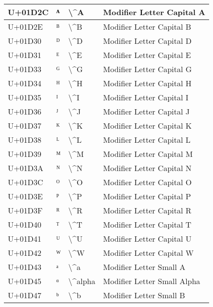 \begin{table}[h]
\begin{tabulary}{\linewidth}{|L|L|L|L|}
\hline
U+01D2C & ᴬ & {\textbackslash}{\textasciicircum}A & Modifier Letter Capital A \\
\hline
U+01D2E & ᴮ & {\textbackslash}{\textasciicircum}B & Modifier Letter Capital B \\
\hline
U+01D30 & ᴰ & {\textbackslash}{\textasciicircum}D & Modifier Letter Capital D \\
\hline
U+01D31 & ᴱ & {\textbackslash}{\textasciicircum}E & Modifier Letter Capital E \\
\hline
U+01D33 & ᴳ & {\textbackslash}{\textasciicircum}G & Modifier Letter Capital G \\
\hline
U+01D34 & ᴴ & {\textbackslash}{\textasciicircum}H & Modifier Letter Capital H \\
\hline
U+01D35 & ᴵ & {\textbackslash}{\textasciicircum}I & Modifier Letter Capital I \\
\hline
U+01D36 & ᴶ & {\textbackslash}{\textasciicircum}J & Modifier Letter Capital J \\
\hline
U+01D37 & ᴷ & {\textbackslash}{\textasciicircum}K & Modifier Letter Capital K \\
\hline
U+01D38 & ᴸ & {\textbackslash}{\textasciicircum}L & Modifier Letter Capital L \\
\hline
U+01D39 & ᴹ & {\textbackslash}{\textasciicircum}M & Modifier Letter Capital M \\
\hline
U+01D3A & ᴺ & {\textbackslash}{\textasciicircum}N & Modifier Letter Capital N \\
\hline
U+01D3C & ᴼ & {\textbackslash}{\textasciicircum}O & Modifier Letter Capital O \\
\hline
U+01D3E & ᴾ & {\textbackslash}{\textasciicircum}P & Modifier Letter Capital P \\
\hline
U+01D3F & ᴿ & {\textbackslash}{\textasciicircum}R & Modifier Letter Capital R \\
\hline
U+01D40 & ᵀ & {\textbackslash}{\textasciicircum}T & Modifier Letter Capital T \\
\hline
U+01D41 & ᵁ & {\textbackslash}{\textasciicircum}U & Modifier Letter Capital U \\
\hline
U+01D42 & ᵂ & {\textbackslash}{\textasciicircum}W & Modifier Letter Capital W \\
\hline
U+01D43 & ᵃ & {\textbackslash}{\textasciicircum}a & Modifier Letter Small A \\
\hline
U+01D45 & ᵅ & {\textbackslash}{\textasciicircum}alpha & Modifier Letter Small Alpha \\
\hline
U+01D47 & ᵇ & {\textbackslash}{\textasciicircum}b & Modifier Letter Small B \\

\end{tabulary}
\end{table}

